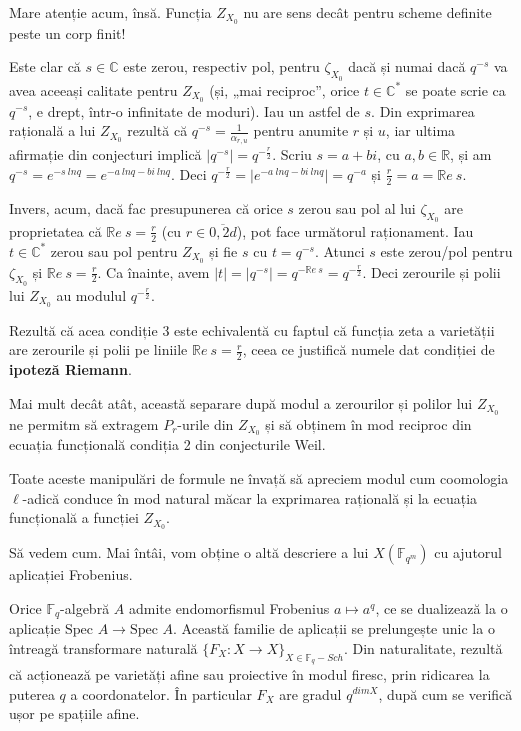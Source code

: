 \documentclass[13pt,openany,oneside]{book}
\begin{document}
Mare atenție acum, însă. Funcția $Z_{X_0}$ nu are sens decât pentru scheme definite peste un corp finit!

Este clar că $s\in\mathbb{C}$ este zerou, respectiv pol, pentru $\zeta_{X_0}$ dacă și numai dacă $q^{-s}$ va avea aceeași calitate pentru $Z_{X_0}$ (și, „mai reciproc”, orice $t \in \mathbb{C}^*$ se poate scrie ca $q^{-s}$, e drept, într-o infinitate de moduri). Iau un astfel de $s$. Din exprimarea rațională a lui $Z_{X_0}$ rezultă că $q^{-s}=\frac{1}{\alpha_{r,u}}$ pentru anumite $r$ și $u$, iar ultima afirmație din conjecturi implică $\mid q^{-s}\mid =q^{-\frac{r}{2}}$. Scriu $s=a+bi$, cu $a,b\in\mathbb{R}$, și am $q^{-s}=e^{-s\ ln q} = e^{-a\ ln q- bi\ ln q}$. Deci $q^{-\frac{r}{2}}=\mid e^{-a\ ln q- bi\ ln q}\mid =q^{-a}$ și $\frac{r}{2}=a=\mathbb{R}e\ s$.

Invers, acum, dacă fac presupunerea că orice $s$ zerou sau pol al lui $\zeta_{X_0}$ are proprietatea că $\mathbb{R}e\ s=\frac{r}{2}$ (cu $r\in\overline{0,2d}$), pot face următorul raționament. Iau $t \in \mathbb{C}^*$ zerou sau pol pentru $Z_{X_0}$ și fie $s$ cu $t=q^{-s}$. Atunci $s$ este zerou/pol pentru $\zeta_{X_0}$ și $\mathbb{R}e\ s=\frac{r}{2}$. Ca înainte, avem $\mid t\mid =\mid q^{-s}\mid =q^{-\mathbb{R}e\ s}=q^{-\frac{r}{2}}$. Deci zerourile și polii lui $Z_{X_0}$ au modulul $q^{-\frac{r}{2}}$.

Rezultă că acea condiție 3 este echivalentă cu faptul că funcția zeta a varietății are zerourile și polii pe liniile $\mathbb{R}e\ s=\frac{r}{2}$, ceea ce justifică numele dat condiției de {\bf ipoteză Riemann}.

Mai mult decât atât, această separare după modul a zerourilor și polilor lui $Z_{X_0}$ ne permitm să extragem $P_r$-urile din $Z_{X_0}$ și să obținem în mod reciproc din ecuația funcțională condiția 2 din conjecturile Weil.

Toate aceste manipulări de formule ne învață să apreciem modul cum coomologia $\ell$-adică conduce în mod natural măcar la exprimarea rațională și la ecuația funcțională a funcției $Z_{X_0}$.

Să vedem cum. Mai întâi, vom obține o altă descriere a lui $X(\mathbb{F}_{q^m})$ cu ajutorul aplicației Frobenius.

Orice $\mathbb{F}_q$-algebră $A$ admite endomorfismul Frobenius $a \mapsto a^q$, ce se dualizează la o aplicație $\text{Spec } A \rightarrow \text{Spec } A$. Această familie de aplicații se prelungește unic la o întreagă transformare naturală $\{F_X : X \rightarrow X\}_{X \in \mathbb{F}_q-Sch}$. Din naturalitate, rezultă că acționează pe varietăți afine sau proiective în modul firesc, prin ridicarea la puterea $q$ a coordonatelor. În particular $F_X$ are gradul $q^{dim X}$, după cum se verifică ușor pe spațiile afine.
\end{document}
